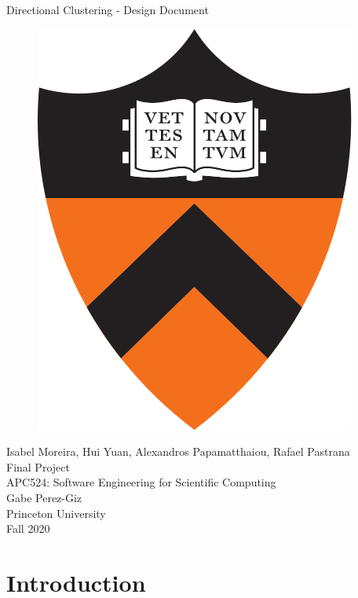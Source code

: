 \documentclass[11pt]{article}
\title{}
\author{}
\date{} %
\begin{document}
\begin{titlepage}
\centering
\vspace*{0mm}
\Large{Directional Clustering -  Design Document}
\vspace{30mm}

\begin{figure}[H]
\centering
\includegraphics[scale=0.2]{images/pton .png}
\end{figure}
\vspace{30mm}
\Large{Isabel Moreira, Hui Yuan, Alexandros Papamatthaiou, Rafael Pastrana}\\

\vspace{8mm}
\large{Final Project  \\ APC524: Software Engineering for Scientific Computing \\ }
\large{Gabe Perez-Giz}\\
\large{Princeton University \\Fall 2020\\}

\end{titlepage}


\section{Introduction}
\end{document}
